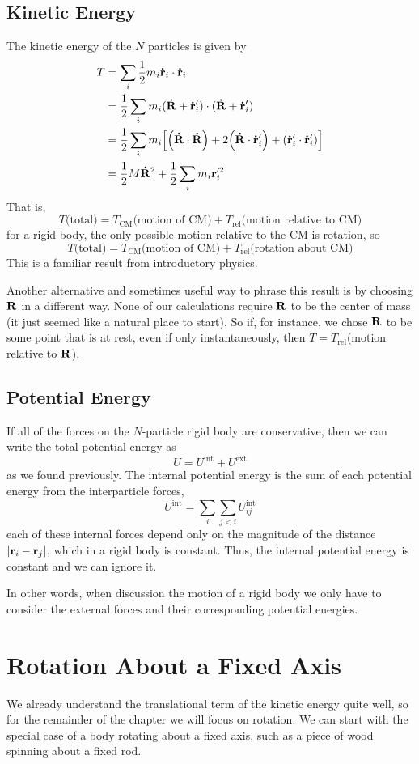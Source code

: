 \subsection*{Kinetic Energy}
The kinetic energy of the $N$ particles is given by
\begin{align*}
    T &= \sum_i\frac{1}{2}m_i\mbf{\dot r}_i\cdot \mbf{\dot r}_i \\
    &= \frac{1}{2}\sum_i m_i (\mbf{\dot R} + \mbf{\dot r}_i') \cdot (\mbf{\dot R} + \mbf{\dot r}_i') \\
    &= \frac{1}{2}\sum_i m_i\bqty{\pqty{\mbf{\dot R} \cdot \mbf{\dot R}} + 2\pqty{\mbf{\dot R} \cdot \mbf{\dot r}_i'} + \pqty{\mbf{\dot r}_i'\cdot\mbf{\dot r}_i'} } \\
    &= \frac{1}{2}M\mbf{\dot R}^2 + \frac{1}{2}\sum_i m_i\mbf{r}_i'^2
\end{align*}
That is,
\[ T \text{(total)} = T_\text{CM}\text{(motion of CM)} + T  _\text{rel}\text{(motion relative to CM)}\]
for a rigid body, the only possible motion relative to the CM is rotation, so
\[ T \text{(total)} = T_\text{CM}\text{(motion of CM)} + T  _\text{rel}\text{(rotation about CM)}\]
This is a familiar result from introductory physics.

Another alternative and sometimes useful way to phrase this result is by choosing $\mathbf{R}$ in a different way. None of our calculations require $\mathbf{R}$ to be the center of mass (it just seemed like a natural place to start). So if, for instance, we chose $\mathbf{R}$ to be some point that is at rest, even if only instantaneously, then $T = T_\text{rel}$(motion relative to $\mathbf{R}$).
\subsection*{Potential Energy}
If all of the forces on the $N$-particle rigid body are conservative, then we can write the total potential energy as
\[ U = U^\text{int} + U^\text{ext} \]
as we found previously. The internal potential energy is the sum of each potential energy from the interparticle forces,
\[ U^\text{int} = \sum_i \sum_{j<i} U^\text{int}_{ij}\]
each of these internal forces depend only on the magnitude of the distance $\abs{\mathbf{r}_i - \mathbf{r}_j}$, which in a rigid body is constant. Thus, the internal potential energy is constant and we can ignore it.

In other words, when discussion the motion of a rigid body we only have to consider the external forces and their corresponding potential energies.
\section{Rotation About a Fixed Axis}
We already understand the translational term of the kinetic energy quite well, so for the remainder of the chapter we will focus on rotation. We can start with the special case of a body rotating about a fixed axis, such as a piece of wood spinning about a fixed rod.

